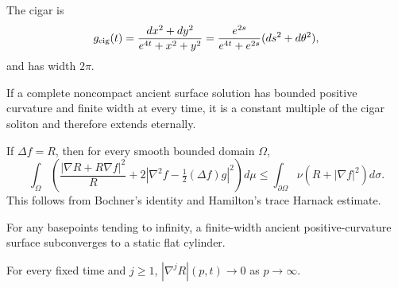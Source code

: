 \begin{example}
\label{ex:chow-iv-cigar}

The cigar is
\[
 g_{\rm cig}(t)=\frac{dx^2+dy^2}{e^{4t}+x^2+y^2}
 =\frac{e^{2s}}{e^{4t}+e^{2s}}(ds^2+d\theta^2),
\]
and has width \(2\pi\).
\end{example}

\begin{theorem}
\label{thm:chow-iv-finite-width-classification}

If a complete noncompact ancient surface solution has bounded positive
curvature and finite width at every time, it is a constant multiple of the
cigar soliton and therefore extends eternally.
\end{theorem}

\begin{lemma}
\label{lem:chow-iv-bochner-inequality}

If \(\Delta f=R\), then for every smooth bounded domain \(\Omega\),
\[
\int_\Omega\left(\frac{|\nabla R+R\nabla f|^2}{R}
 +2\left|\nabla^2f-\tfrac12(\Delta f)g\right|^2\right)d\mu
\le\int_{\partial\Omega}\nu(R+|\nabla f|^2)d\sigma.
\]
This follows from Bochner's identity and Hamilton's trace Harnack estimate.
\end{lemma}

\begin{lemma}
\label{lem:chow-iv-asymptotically-cylindrical}


For any basepoints tending to infinity, a finite-width ancient positive-curvature
surface subconverges to a static flat cylinder.
\end{lemma}

\begin{lemma}
\label{lem:chow-iv-curvature-derivatives-decay}

For every fixed time and \(j\ge1\), \(|\nabla^jR|(p,t)\to0\) as \(p\to\infty\).
\end{lemma}

